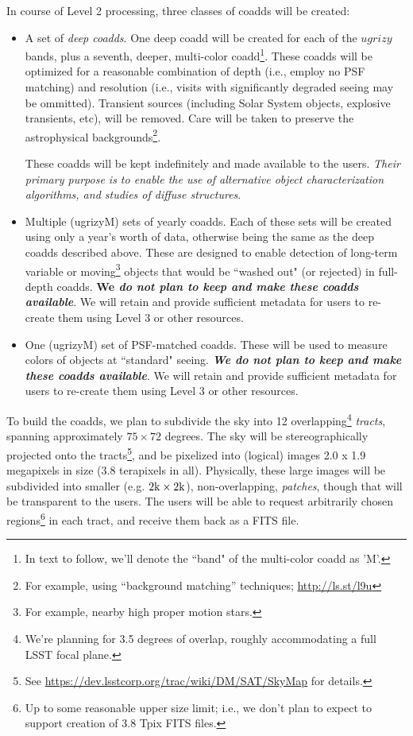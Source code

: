 \documentclass[12pt]{article}
\begin{document}
In course of Level 2 processing, three classes of coadds will be created:
    \begin{itemize}
        \item A set of {\em deep coadds}. One deep coadd will be created for each of the $ugrizy$ bands, plus a seventh, deeper, multi-color coadd\footnote{In text to follow, we'll denote the ``band" of the multi-color coadd as 'M'.}. These coadds will be optimized for a reasonable combination of depth (i.e., employ no PSF matching) and resolution (i.e., visits with significantly degraded seeing may be ommitted). Transient sources (including Solar System objects, explosive transients, etc), will be removed. Care will be taken to preserve the astrophysical backgrounds\footnote{For example, using ``background matching'' techniques; \url{http://ls.st/l9u}}.
 
        These coadds will be kept indefinitely and made available to the users. {\em Their primary purpose is to enable the use of alternative object characterization algorithms, and studies of diffuse structures}.

               \item Multiple (ugrizyM) sets of yearly coadds. Each of these sets will be created using only a year's worth of data, otherwise being the same as the deep coadds described above. These are designed to enable detection of long-term variable or moving\footnote{For example, nearby high proper motion stars.} objects that would be ``washed out" (or rejected) in full-depth coadds. {\bf We \em do not plan to keep and make these coadds available}. We will retain and provide sufficient metadata for users to re-create them using Level 3 or other resources.
        \item One (ugrizyM) set of PSF-matched coadds. These will be used to measure colors of objects at ``standard" seeing. {\bf \em We do not plan to keep and make these coadds available}. We will retain and provide sufficient metadata for users to re-create them using Level 3 or other resources.
    \end{itemize}

To build the coadds, we plan to subdivide the sky into 12 overlapping\footnote{We're planning for 3.5 degrees of overlap, roughly accommodating a full LSST focal plane.} {\em tracts}, spanning approximately $75 \times 72$ degrees. The sky will be stereographically projected onto the tracts\footnote{See \url{https://dev.lsstcorp.org/trac/wiki/DM/SAT/SkyMap} for details.}, and be pixelized into (logical) images 2.0 x 1.9 megapixels in size (3.8 terapixels in all). Physically, these large images will be subdivided into smaller (e.g. $2{\rm k} \times 2{\rm k}$), non-overlapping, {\em patches}, though that will be transparent to the users. The users will be able to request arbitrarily chosen regions\footnote{Up to some reasonable upper size limit; i.e., we don't plan to expect to support creation of 3.8 Tpix FITS files.} in each tract, and receive them back as a FITS file.
\end{document}

